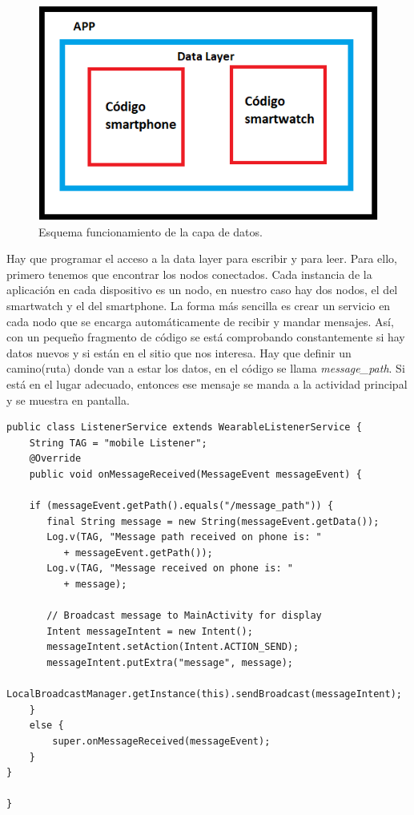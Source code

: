 \documentclass[12pt]{article}
\numberwithin{equation}{section}
\begin{document}
\begin{figure}[h]
    \centering
    \includegraphics[width=1\textwidth]{esquemacodigo.png}
    \caption{Esquema funcionamiento de la capa de datos.}
    \label{fig:datalayer}
\end{figure}


Hay que programar el acceso a la data layer para escribir y para leer. Para ello, primero tenemos que encontrar los nodos conectados. Cada instancia de la aplicación en cada dispositivo es un nodo, en nuestro caso hay dos nodos, el del smartwatch y el del smartphone. La forma más sencilla es crear un servicio en cada nodo que se encarga automáticamente de recibir y mandar mensajes. Así, con un pequeño fragmento de código se está comprobando constantemente si hay datos nuevos y si están en el sitio que nos interesa. Hay que definir un camino(ruta) donde van a estar los datos, en el código se llama \textit{message\_path}. Si está en el lugar adecuado, entonces ese mensaje se manda a la actividad principal y se muestra en pantalla.


\begin{lstlisting}
public class ListenerService extends WearableListenerService {
    String TAG = "mobile Listener";
    @Override
    public void onMessageReceived(MessageEvent messageEvent) {

    if (messageEvent.getPath().equals("/message_path")) {
       final String message = new String(messageEvent.getData());
       Log.v(TAG, "Message path received on phone is: "
          + messageEvent.getPath());
       Log.v(TAG, "Message received on phone is: "
          + message);

       // Broadcast message to MainActivity for display
       Intent messageIntent = new Intent();
       messageIntent.setAction(Intent.ACTION_SEND);
       messageIntent.putExtra("message", message);
       LocalBroadcastManager.getInstance(this).sendBroadcast(messageIntent);
    }
    else {
        super.onMessageReceived(messageEvent);
    }
}

}

\end{lstlisting}
\end{document}
